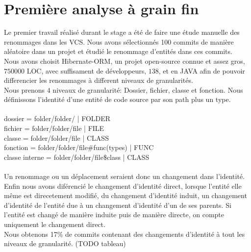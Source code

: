 \section{Première analyse à grain fin}
\label{sec:analyse_fin_grain}

Le premier travail réalisé durant le stage a été de faire une étude manuelle des renommages dans les VCS. Nous avons sélectionnés 100 commits de manière aléatoire dans un projet et étudié le renommage d'entités dans ces commits.\\
Nous avons choisit Hibernate-ORM, un projet open-source connue et assez gros, $750000$ LOC, avec suffisament de développeurs, $138$, et en JAVA afin de pouvoir differencier les renommages à different niveaux de granularités.\\
Nous prenons $4$ niveaux de granularité: Dossier, fichier, classe et fonction. Nous définissons l'identité d'une entité de code source par son path plus un type. \\\\
dossier = folder/folder/ | FOLDER\\
fichier = folder/folder/file | FILE\\
classe = folder/folder/file | CLASS\\
fonction = folder/folder/file\#func(types) | FUNC\\
classe interne = folder/folder/file\$class | CLASS\\\\
Un renommage ou un déplacement seraient donc un changement dans l'identité. Enfin nous avons diférencié le changement d'identité direct, lorsque l'entité elle même est direcetement modifié, du changement d'identité induit, un changement d'identité de l'entité due à un changement d'identité d'un de ses parents. Si l'entité est changé de manière induite puis de manière directe, on compte uniquement le changement direct.\\
Nous obtenons 17\% de commits contenant des changements d'identité à tout les niveaux de granularité. (TODO tableau)\\

